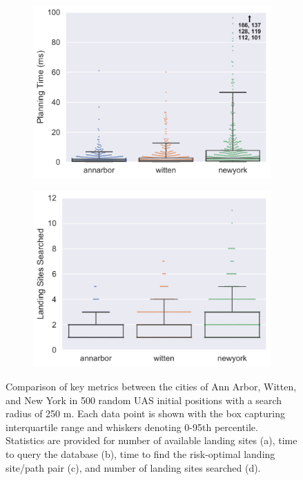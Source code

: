 \begin{figure}[ht]
\begin{subfigure}[b]{0.475\textwidth}
    \centering\includegraphics[width=\textwidth]{chapter_5_mapping/imgs/random_time_bw.pdf}
    \caption{\label{fig:ch5_random_plan_time}}
  \end{subfigure}%
  \quad
  \begin{subfigure}[b]{0.475\textwidth}
    \centering\includegraphics[width=\textwidth]{chapter_5_mapping/imgs/random_total_goal_searches_bw.pdf}
    \caption{\label{fig:ch5_random_ls_searched}}
  \end{subfigure}%
  \caption[Metrics for map-based planner]{Comparison of key metrics between the cities of Ann Arbor, Witten, and New York in 500 random UAS initial positions with a search radius of 250 m. Each data point is shown with the box capturing interquartile range and whiskers denoting 0-95th percentile. Statistics are provided for number of available landing sites (a), time to query the database (b), time to find the risk-optimal landing site/path pair (c), and number of landing sites searched (d).}
  \label{fig:ch5_random_stats}
\end{figure}


